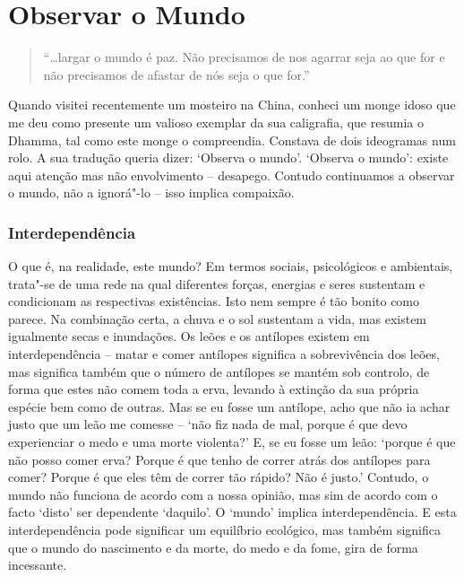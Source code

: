 
\chapter{Observar o Mundo}


\begin{quote}
  ``\ldots{}largar o mundo é paz. Não precisamos de nos agarrar seja ao que for e não precisamos de afastar de nós seja o que for.''

\end{quote}

Quando visitei recentemente um mosteiro na China, conheci um monge idoso que me
deu como presente um valioso exemplar da sua caligrafia, que resumia o Dhamma,
tal como este monge o compreendia. Constava de dois ideogramas num rolo. A sua
tradução queria dizer: `Observa o mundo'. `Observa o mundo': existe aqui atenção
mas não envolvimento -- desapego. Contudo continuamos a observar o mundo, não a
ignorá"-lo -- isso implica compaixão.

\subsection{Interdependência}

O que é, na realidade, este mundo? Em termos sociais, psicológicos e ambientais,
trata"-se de uma rede na qual diferentes forças, energias e seres sustentam e
condicionam as respectivas existências. Isto nem sempre é tão bonito como
parece. Na combinação certa, a chuva e o sol sustentam a vida, mas existem
igualmente secas e inundações. Os leões e os antílopes existem em
interdependência -- matar e comer antílopes significa a sobrevivência dos leões,
mas significa também que o número de antílopes se mantém sob controlo, de forma
que estes não comem toda a erva, levando à extinção da sua própria espécie bem
como de outras. Mas se eu fosse um antílope, acho que não ia achar justo que um
leão me comesse -- `não fiz nada de mal, porque é que devo experienciar o medo e
uma morte violenta?' E, se eu fosse um leão: `porque é que não posso comer erva?
Porque é que tenho de correr atrás dos antílopes para comer? Porque é que eles
têm de correr tão rápido? Não é justo.' Contudo, o mundo não funciona de acordo
com a nossa opinião, mas sim de acordo com o facto `disto' ser dependente
`daquilo'. O `mundo' implica interdependência. E esta interdependência pode
significar um equilíbrio ecológico, mas também significa que o mundo do
nascimento e da morte, do medo e da fome, gira de forma incessante.

